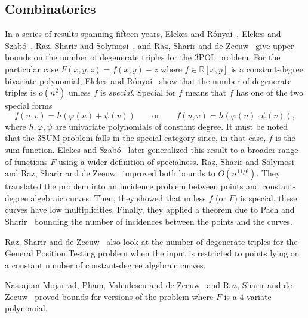\subsection{Combinatorics}%
\label{sec:history:pol:combinatorics}

In a series of results spanning fifteen years,
Elekes and Rónyai~\cite{ER00},
Elekes and Szabó~\cite{ES12},
Raz, Sharir and Solymosi~\cite{RSS14}, and
Raz, Sharir and de Zeeuw~\cite{RSZ15}
give upper bounds on the number of degenerate triples for the 3POL problem.
%
For the particular case $F(x,y,z) = f(x,y) - z$ where $f \in \mathbb{R}[x,y]$
is a constant-degree bivariate polynomial, Elekes and Rónyai~\cite{ER00} show
that the number of degenerate triples is $o(n^2)$ unless $f$ is
\emph{special}. Special for $f$ means that $f$ has one of the two special forms
\begin{displaymath}
f(u,v)=h(\varphi(u)+\psi(v))
\qquad
\text{or}
\qquad
f(u,v)=h(\varphi(u)\cdot\psi(v)),
\end{displaymath}
where $h,\varphi,\psi$ are univariate polynomials of constant degree.
It must be noted that the 3SUM problem falls in the special category since, in
that case, \( f \) is the sum function.
%
Elekes and Szabó~\cite{ES12} later generalized this result to a broader range
of functions $F$ using a wider definition of specialness.
%
Raz, Sharir and Solymosi~\cite{RSS14} and Raz, Sharir and de Zeeuw~\cite{RSZ15}
improved both bounds to $O(n^{11/6})$.
%
They translated the problem into an incidence problem between points and
constant-degree algebraic curves. Then, they showed that unless $f$ (or $F$) is
special, these curves have low multiplicities. Finally, they applied a theorem
due to Pach and Sharir~\cite{PS98} bounding the number of incidences between
the points and the curves.
%


Raz, Sharir and de Zeeuw~\cite{RSZ15} also look at the number of degenerate
triples for the General Position Testing problem when the input is restricted
to points lying on a constant number of constant-degree algebraic curves.
%


Nassajian Mojarrad, Pham, Valculescu and de Zeeuw~\cite{MPVd16} and
Raz, Sharir and de Zeeuw~\cite{RSZ16} proved bounds for versions of the
problem where $F$ is a $4$-variate polynomial.

